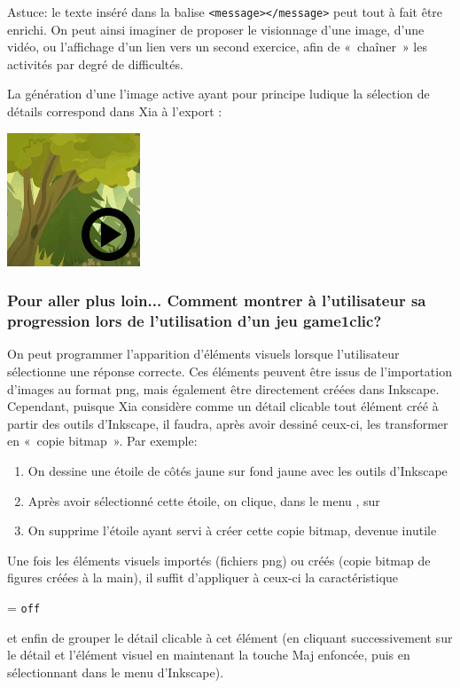 {Astuce: le texte inséré dans la balise \verb|<message></message>| peut 
tout à fait être enrichi. 
On peut ainsi imaginer de proposer le visionnage d'une image, d'une vidéo, ou l'affichage d'un lien vers un second exercice, afin 
de «~chaîner~» les activités par degré de difficultés.

La génération d'une l'image active ayant pour principe ludique la sélection de détails
correspond dans Xia à l'export :

\begin{center}
\includegraphics[scale=0.7]{./images/game1clic} 
\end{center}

\subsubsection{Pour aller plus loin... Comment montrer à l'utilisateur sa progression lors de l'utilisation d'un jeu game1clic?}\label{detail_progression}

On peut programmer l'apparition d'éléments visuels lorsque l'utilisateur sélectionne une réponse correcte. 
Ces éléments peuvent être issus de l'importation d'images au format png, mais également 
être directement créées dans Inkscape.
Cependant, puisque Xia considère comme un détail clicable tout élément créé à partir des outils 
d'Inkscape, il faudra, après avoir dessiné ceux-ci, les transformer en «~copie bitmap~».
Par exemple:
\begin{enumerate}
 \item On dessine une étoile de côtés jaune sur fond jaune avec les outils d'Inkscape
 \item Après avoir sélectionné cette étoile, on clique, dans le menu , sur 
 \item On supprime l'étoile ayant servi à créer cette copie bitmap, devenue inutile
\end{enumerate}

Une fois les éléments visuels importés (fichiers png) ou créés (copie bitmap de figures créées à la main),
il suffit d'appliquer à ceux-ci la caractéristique
\begin{center}
 = \verb|off|
\end{center}
et enfin de grouper le détail clicable à cet élément (en cliquant successivement sur le détail et l'élément visuel en maintenant 
la touche Maj enfoncée, puis en sélectionnant  dans le menu  d'Inkscape).

}
